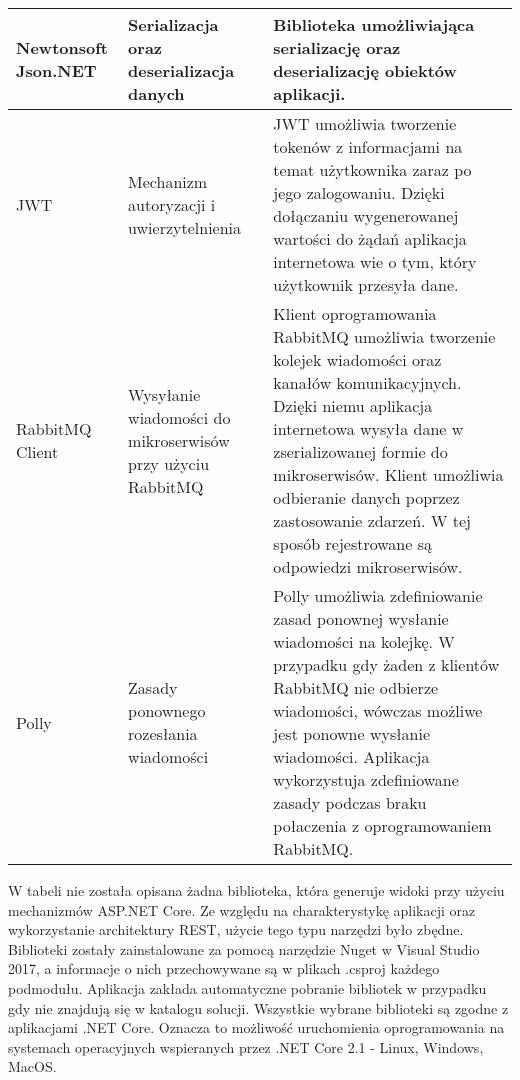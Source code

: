 \begin{center}
\begin{longtable}{ | p{3.1cm} | p{4cm} | p{6.5cm} |}
    \hline Newtonsoft Json.NET  
    & Serializacja oraz deserializacja danych
    & Biblioteka umożliwiająca serializację oraz deserializację obiektów aplikacji.\\ \hline
    
    \hline JWT
     & Mechanizm autoryzacji i uwierzytelnienia
    & JWT umożliwia tworzenie tokenów z informacjami na temat użytkownika zaraz po jego zalogowaniu. Dzięki dołączaniu wygenerowanej wartości do żądań aplikacja internetowa wie o tym, który użytkownik przesyła dane.\\ \hline
    
     \hline RabbitMQ Client
    & Wysyłanie \newline wiadomości do \newline mikroserwisów przy użyciu RabbitMQ
    & Klient oprogramowania RabbitMQ umożliwia tworzenie kolejek wiadomości oraz kanałów komunikacyjnych. Dzięki niemu aplikacja internetowa wysyła dane w zserializowanej formie do mikroserwisów. Klient umożliwia odbieranie danych poprzez zastosowanie zdarzeń. W tej sposób rejestrowane są odpowiedzi mikroserwisów.\\ \hline
    
     \hline Polly
    & Zasady ponownego rozesłania wiadomości
    & Polly umożliwia zdefiniowanie zasad ponownej wysłanie wiadomości na kolejkę. W przypadku gdy żaden z klientów RabbitMQ nie odbierze wiadomości, wówczas możliwe jest ponowne wysłanie wiadomości. Aplikacja wykorzystuja zdefiniowane zasady podczas braku połaczenia z oprogramowaniem RabbitMQ.\\ \hline
    
	\end{longtable}
\end{center}

W tabeli nie została opisana żadna biblioteka, która generuje widoki przy użyciu mechanizmów ASP.NET Core. Ze względu na charakterystykę aplikacji oraz wykorzystanie architektury REST, użycie tego typu narzędzi było zbędne. Biblioteki zostały zainstalowane za pomocą narzędzie Nuget w Visual Studio 2017, a informacje o nich przechowywane są w plikach .csproj każdego podmodułu. Aplikacja zakłada automatyczne pobranie bibliotek w przypadku gdy nie znajdują się w katalogu solucji. Wszystkie wybrane biblioteki są zgodne z aplikacjami .NET Core. Oznacza to możliwość uruchomienia oprogramowania na systemach operacyjnych wspieranych przez .NET Core 2.1 - Linux, Windows, MacOS.

